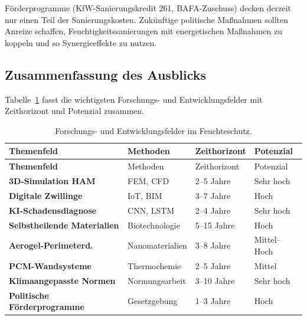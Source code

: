 ﻿\documentclass[a4paper,12pt]{article}
\theoremstyle{definition}
\begin{document}
F\"orderprogramme (KfW-Sanierungskredit 261, BAFA-Zuschuss) decken
derzeit nur einen Teil der Sanierungskosten. Zuk\"unftige politische
Ma\ss{}nahmen sollten Anreize schaffen, Feuchtigkeitssanierungen mit
energetischen Ma\ss{}nahmen zu koppeln und so Synergieeffekte zu nutzen.

\subsection{Zusammenfassung des Ausblicks}

Tabelle~\ref{tab:ausblick} fasst die wichtigsten Forschungs- und
Entwicklungsfelder mit Zeithorizont und Potenzial zusammen.

\begin{longtable}{>{\bfseries}p{4.0cm}p{3.0cm}p{2.5cm}p{3.0cm}}
  \caption{Forschungs- und Entwicklungsfelder im Feuchteschutz.}
  \label{tab:ausblick}\\
  \toprule
  Themenfeld & Methoden & Zeithorizont & Potenzial \\
  \midrule
  \endfirsthead
  \toprule
  Themenfeld & Methoden & Zeithorizont & Potenzial \\
  \midrule
  \endhead
  \bottomrule
  \endfoot
  3D-Simulation HAM & FEM, CFD & 2--5 Jahre & Sehr hoch \\
  Digitale Zwillinge & IoT, BIM & 3--7 Jahre & Hoch \\
  KI-Schadensdiagnose & CNN, LSTM & 2--4 Jahre & Sehr hoch \\
  Selbstheilende Materialien & Biotechnologie & 5--15 Jahre & Hoch \\
  Aerogel-Perimeterd. & Nanomaterialien & 3--8 Jahre & Mittel--Hoch \\
  PCM-Wandsysteme & Thermochemie & 2--5 Jahre & Mittel \\
  Klimaangepasste Normen & Normungsarbeit & 3--10 Jahre & Sehr hoch \\
  Politische F\"orderprogramme & Gesetzgebung & 1--3 Jahre & Hoch \\
\end{longtable}
\end{document}
